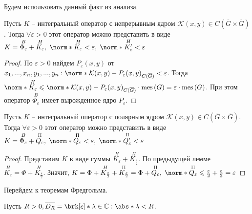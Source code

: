 Будем использовать данный факт из анализа.

\begin{lemma}
  Пусть $K$ -- интегральный оператор с непрерывным ядром $\mathcal{K}(x,y) \in C ( \overline{G} \times \overline{G} )$. Тогда $\forall \varepsilon > 0$ этот оператор можно представить в виде $K = \overset{B}{\Phi_{\varepsilon}} + \overset{H}{K_{\varepsilon}}, \; \norm*{\overset{H}{K_{\varepsilon}}} < \varepsilon, \; \norm*{\overset{H}{K'_{\varepsilon}}} < \varepsilon$
\end{lemma}
\begin{proof}
  По $\varepsilon > 0$ найдем $P_{\varepsilon}(x,y)$ от $x_{1},...,x_{n},y_{1},...,y_{n} : \norm*{\mathcal{K}(x,y) - P_{\varepsilon}(x,y)}_{C(\overline{G})} < \varepsilon$. Тогда $\norm*{\overset{H}{K_{\varepsilon}}} \leq \norm*{\mathcal{K}(x,y) - P_{\varepsilon}(x,y)}_{C(\overline{G})}\cdot \mathrm{mes}\, (G) = \varepsilon\cdot \mathrm{mes}\, (G)$. При этом оператор $\overset{B}{\Phi_{\varepsilon}}$ имеет вырожденное ядро $P_{\varepsilon}$.
\end{proof}

\begin{lemma}
  Пусть $K$ -- интегральный оператор с полярным ядром $\mathcal{K}(x,y) \in C ( \overline{G} \times \overline{G} )$. Тогда $\forall \varepsilon > 0$ этот оператор можно представить в виде $K = \overset{B}{\Phi_{\varepsilon}} + \overset{\Pi}{Q_{\varepsilon}}, \; \norm*{\overset{\Pi}{Q_{\varepsilon}}} < \varepsilon, \; \norm*{\overset{\Pi}{Q'_{\varepsilon}}} < \varepsilon$
\end{lemma}
\begin{proof}
Представим $K$ в виде суммы $\overset{H}{K_{\varepsilon}} + \overset{\Pi}{K_{\frac{\varepsilon}{2}}}$. По предыдущей лемме $\overset{H}{K_{\varepsilon}} = \Phi+ \overset{H}{K_{\frac{\varepsilon}{2}}}$. Значит, $K = \Phi+ \overset{H}{K_{\frac{\varepsilon}{2}}} + \overset{\Pi}{K_{\frac{\varepsilon}{2}}} = \Phi + \overset{\Pi}{Q_{\varepsilon}}, \; \norm*{\overset{\Pi}{Q_{\varepsilon}}} \leq \frac{\varepsilon}{2} + \frac{\varepsilon}{2} = \varepsilon$
\end{proof}

Перейдем к теоремам Фредгольма.

Пусть $R > 0, \overline{D_{R}} = \brk[c]*{\lambda \in \C: \abs*{\lambda} < R}$.

